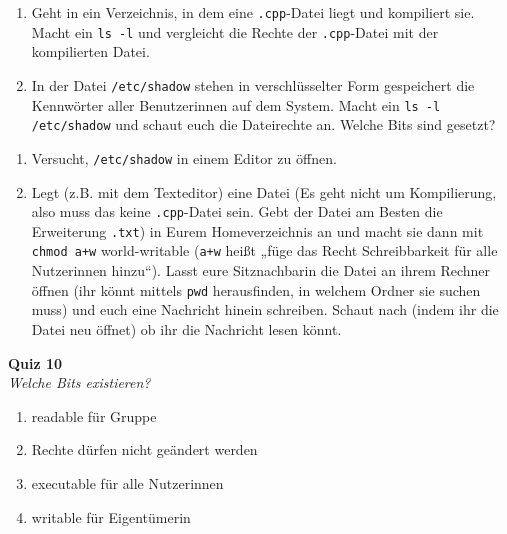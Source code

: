 \begin{praxis}
    \begin{enumerate}
        \item Geht in ein Verzeichnis, in dem eine \texttt{.cpp}-Datei liegt und
              kompiliert sie. Macht ein \texttt{ls -l} und vergleicht die Rechte der
              \texttt{.cpp}-Datei mit der kompilierten Datei.
        \item In der Datei \texttt{/etc/shadow} stehen in verschlüsselter Form
              gespeichert die Kennwörter aller Benutzerinnen auf dem System. Macht ein
              \texttt{ls -l /etc/shadow} und schaut euch die Dateirechte an. Welche
              Bits sind gesetzt?
    \end{enumerate}
\end{praxis}

\begin{spiel}
\begin{enumerate}
    \item Versucht, \texttt{/etc/shadow} in einem Editor zu öffnen.
    \item Legt (z.B. mit dem Texteditor) eine Datei (Es geht nicht um
        Kompilierung, also muss das keine \texttt{.cpp}-Datei sein. Gebt der
        Datei am Besten die Erweiterung \texttt{.txt}) in Eurem Homeverzeichnis
        an und macht sie dann mit \texttt{chmod a+w} world-writable
        (\texttt{a+w} heißt „füge das Recht Schreibbarkeit für alle Nutzerinnen
        hinzu“).  Lasst eure Sitznachbarin die Datei an ihrem Rechner öffnen
        (ihr könnt mittels \texttt{pwd} herausfinden, in welchem Ordner sie
        suchen muss) und euch eine Nachricht hinein schreiben. Schaut nach
        (indem ihr die Datei neu öffnet) ob ihr die Nachricht lesen könnt.
\end{enumerate}
\end{spiel}

\textbf{Quiz 10}\\
\textit{Welche Bits existieren?}
\begin{enumerate}[label=\alph*)]
    \item readable für Gruppe
    \item Rechte dürfen nicht geändert werden
    \item executable für alle Nutzerinnen
    \item writable für Eigentümerin
\end{enumerate}
